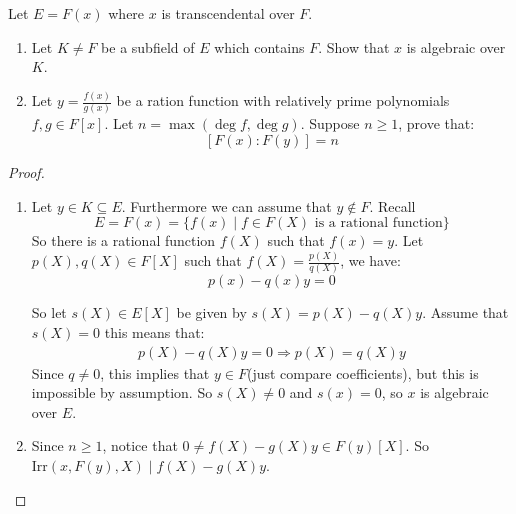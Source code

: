 \begin{exercise}
    Let $E=F(x)$ where $x$ is transcendental over $F$. 

    \begin{enumerate}[label = (\alph*)]
        \item Let $K\neq F$ be a subfield of $E$ which contains $F$. Show that $x$ is algebraic over $K$.
        \item Let $y=\frac{f(x)}{g(x)}$ be a ration function with relatively prime polynomials $f,g\in F[x]$. Let $n = \max(\deg f,\deg g)$. Suppose $n\geq 1$, prove that:
        \[[F(x)\colon F(y)] = n\]
    \end{enumerate}

    \begin{proof}
        \begin{enumerate}[label = (\alph*)]
            \item Let $y\in K\subseteq E$. Furthermore we can assume that $y\not\in F$. Recall \[E = F(x) = \{f(x) \mid f\in F(X) \text{ is a rational function}\}\] 
            So there is a rational function $f(X)$ such that $f(x) = y$. Let $p(X),q(X)\in F[X]$ such that $f(X) = \frac{p(X)}{q(X)}$, we have:\begin{equation}
                p(x) - q(x)y = 0
            \end{equation}

            So let $s(X)\in E[X]$ be given by $s(X) = p(X) - q(X)y$. Assume that $s(X) = 0$ this means that:\begin{align*}
                p(X) -q(X)y = 0 \Rightarrow p(X) = q(X)y
            \end{align*}
            Since $q\neq 0$, this implies that $y\in F$(just compare coefficients), but this is impossible by assumption. So $s(X)\neq 0$ and $s(x) = 0$, so $x$ is algebraic over $E$. 

            \item Since $n\geq 1$, notice that $0\neq f(X) - g(X)y \in F(y)[X]$. So $\text{Irr}(x,F(y),X) \mid f(X) - g(X)y$.
            

        \end{enumerate}    
    \end{proof}
\end{exercise}

